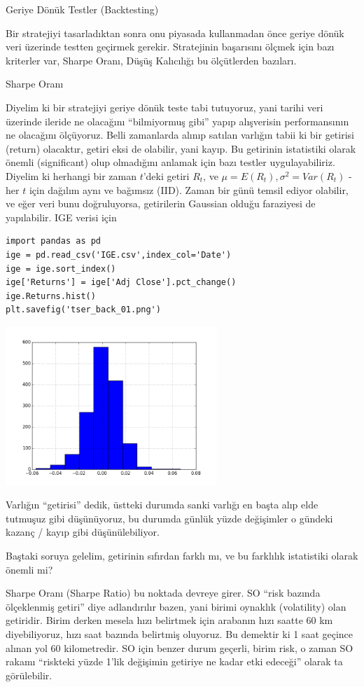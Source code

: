 \documentclass[12pt,fleqn]{article}\usepackage{../../common}
\begin{document}
Geriye Dönük Testler (Backtesting)

Bir stratejiyi tasarladıktan sonra onu piyasada kullanmadan önce geriye dönük
veri üzerinde testten geçirmek gerekir. Stratejinin başarısını ölçmek için bazı
kriterler var, Sharpe Oranı, Düşüş Kalıcılığı bu ölçütlerden bazıları. 

Sharpe Oranı 

Diyelim ki bir stratejiyi geriye dönük teste tabi tutuyoruz, yani tarihi veri
üzerinde ileride ne olacağını ``bilmiyormuş gibi'' yapıp alışverisin
performansının ne olacağını ölçüyoruz. Belli zamanlarda alınıp satılan varlığın
tabii ki bir getirisi (return) olacaktır, getiri eksi de olabilir, yani
kayıp. Bu getirinin istatistiki olarak önemli (significant) olup olmadığını
anlamak için bazı testler uygulayabiliriz. Diyelim ki herhangi bir zaman
$t$'deki getiri $R_t$, ve $\mu = E(R_t), \sigma^2=Var(R_t)$ - her $t$ için
dağılım aynı ve bağımsız (IID). Zaman bir günü temsil ediyor olabilir, ve eğer
veri bunu doğruluyorsa, getirilerin Gaussian olduğu faraziyesi de
yapılabilir. IGE verisi için

\begin{verbatim}
import pandas as pd
ige = pd.read_csv('IGE.csv',index_col='Date')
ige = ige.sort_index()
ige['Returns'] = ige['Adj Close'].pct_change()
ige.Returns.hist()
plt.savefig('tser_back_01.png')
\end{verbatim}

\includegraphics[height=6cm]{tser_back_01.png}

Varlığın ``getirisi'' dedik, üstteki durumda sanki varlığı en başta alıp
elde tutmuşuz gibi düşünüyoruz, bu durumda günlük yüzde değişimler o gündeki
kazanç / kayıp gibi düşünülebiliyor. 

Baştaki soruya gelelim, getirinin sıfırdan farklı mı, ve bu farklılık
istatistiki olarak önemli mi?

Sharpe Oranı (Sharpe Ratio) bu noktada devreye girer. SO ``risk bazında
ölçeklenmiş getiri'' diye adlandırılır bazen, yani birimi oynaklık (volatility)
olan getiridir. Birim derken mesela hızı belirtmek için arabanın hızı saatte 60
km diyebiliyoruz, hızı saat bazında belirtmiş oluyoruz. Bu demektir ki 1 saat
geçince alınan yol 60 kilometredir. SO için benzer durum geçerli, birim risk, o
zaman SO rakamı ``riskteki yüzde 1'lik değişimin getiriye ne kadar etki
edeceği'' olarak ta görülebilir.
\end{document}
